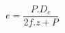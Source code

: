 \documentclass[12pt]{article}
\begin{document}
\begin{displaymath}
e = \frac {P . D_e} {2f . z + P}
\end{displaymath}
\end{document}
